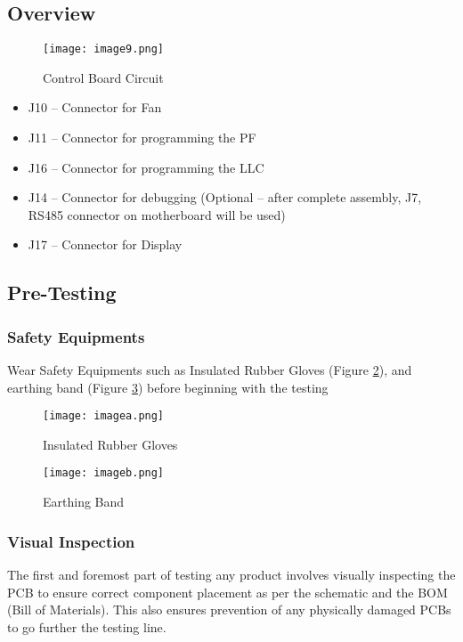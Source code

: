 \subsection{Overview}
\begin{figure}[H]
    \centering
    \texttt{[image: image9.png]}
    \caption{Control Board Circuit}
    \label{fig:image9}
\end{figure}
\begin{itemize}
    \item J10 – Connector for Fan
    \item J11 – Connector for programming the PF
    \item J16 – Connector for programming the LLC
    \item J14 – Connector for debugging (Optional – after complete assembly, J7, RS485 connector on motherboard will be used)
    \item J17 – Connector for Display
\end{itemize}

\subsection{Pre-Testing}

\subsubsection{Safety Equipments}
Wear Safety Equipments such as Insulated Rubber Gloves (Figure \ref{fig:imagea}), and earthing band (Figure \ref{fig:imageb}) before beginning with the testing
\begin{figure}[H]
    \centering
    \texttt{[image: imagea.png]}
    \caption{Insulated Rubber Gloves}
    \label{fig:imagea}
\end{figure}
\begin{figure}[H]
    \centering
    \texttt{[image: imageb.png]}
    \caption{Earthing Band}
    \label{fig:imageb}
\end{figure}

\subsubsection{Visual Inspection}
The first and foremost part of testing any product involves visually inspecting the PCB to ensure correct component placement as per the schematic and the BOM (Bill of Materials). This also ensures prevention of any physically damaged PCBs to go further the testing line.



